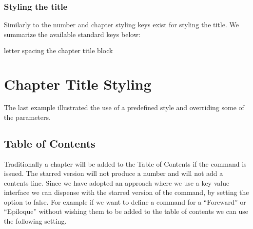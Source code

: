 \subsection{Styling the title}

Similarly to the number and chapter styling keys exist for styling the title. We summarize the available standard keys below:
\medskip



\begin{texexample}{letter spacing the chapter title block}{}
\chapter{Chapter Title Styling}
\end{texexample}



The last example illustrated the use of a predefined style  and overriding some of the parameters.


\section{Table of Contents}

Traditionally a chapter will be added to the Table of Contents if the  command is issued. The starred version will not produce a number and will not add a contents line. Since we have adopted an approach where we use a key value interface we can dispense with the starred version of the command, by setting the  option to false. For example if we want to define a command for a ``Foreward'' or ``Epiloque'' without wishing them to be added to the table of contents we can use the following setting.



